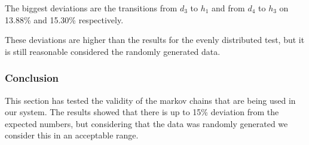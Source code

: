 The biggest deviations are the transitions from $ d_3 $ to $ h_1 $ and from $ d_4 $ to $ h_3 $ on 13.88\% and 15.30\% respectively.

These deviations are higher than the results for the evenly distributed test, but it is still reasonable considered the randomly generated data.

\subsubsection{Conclusion}
This section has tested the validity of the markov chains that are being used in our system.
The results showed that there is up to 15\% deviation from the expected numbers, but considering that the data was randomly generated we consider this in an acceptable range.
